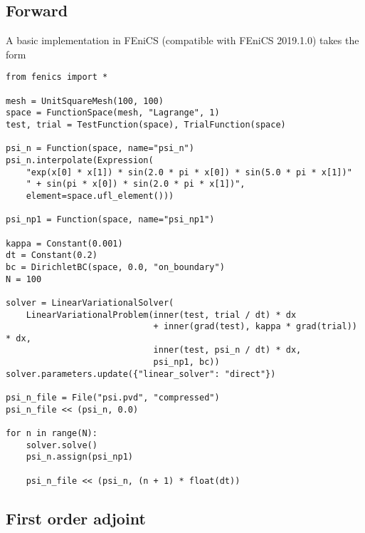 \documentclass[11pt]{article}
\begin{document}
\subsection{Forward}

A basic implementation in FEniCS (compatible with FEniCS 2019.1.0) takes the
form
\begin{lstlisting}
from fenics import *

mesh = UnitSquareMesh(100, 100)
space = FunctionSpace(mesh, "Lagrange", 1)
test, trial = TestFunction(space), TrialFunction(space)

psi_n = Function(space, name="psi_n")
psi_n.interpolate(Expression(
    "exp(x[0] * x[1]) * sin(2.0 * pi * x[0]) * sin(5.0 * pi * x[1])"
    " + sin(pi * x[0]) * sin(2.0 * pi * x[1])",
    element=space.ufl_element()))

psi_np1 = Function(space, name="psi_np1")

kappa = Constant(0.001)
dt = Constant(0.2)
bc = DirichletBC(space, 0.0, "on_boundary")
N = 100

solver = LinearVariationalSolver(
    LinearVariationalProblem(inner(test, trial / dt) * dx
                             + inner(grad(test), kappa * grad(trial)) * dx,
                             inner(test, psi_n / dt) * dx,
                             psi_np1, bc))
solver.parameters.update({"linear_solver": "direct"})

psi_n_file = File("psi.pvd", "compressed")
psi_n_file << (psi_n, 0.0)

for n in range(N):
    solver.solve()
    psi_n.assign(psi_np1)

    psi_n_file << (psi_n, (n + 1) * float(dt))
\end{lstlisting}

\subsection{First order adjoint}
\end{document}
